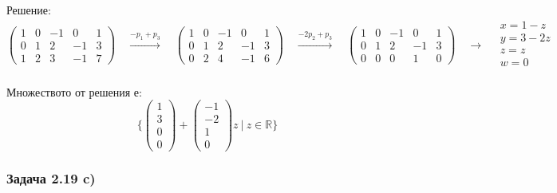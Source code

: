 \documentclass{subfiles}
\begin{document}
\noindent Решение:
\begin{equation*}
    \left(
        \begin{array}{ cccc|c }
            1 & 0 & -1 &  0 & 1 \\
            0 & 1 &  2 &  -1 & 3 \\
            1 & 2 & 3  & -1 & 7
        \end{array}
    \right)
    \quad
    \overset{-p_{1} + p_{3}}{\longrightarrow}
    \quad
    \left(
        \begin{array}{ cccc|c }
            1 & 0 & -1 &  0 & 1 \\
            0 & 1 &  2 &  -1 & 3 \\
            0 & 2 &  4 & -1 & 6
        \end{array}
    \right)
    \quad
    \overset{-2p_{2} + p_{3}}{\longrightarrow}
    \quad
    \left(
        \begin{array}{ cccc|c }
            1 & 0 & -1 &  0 & 1 \\
            0 & 1 &  2 & -1 & 3 \\
            0 & 0 &  0 &  1 & 0
        \end{array}
    \right)
    \quad
    \longrightarrow
    \quad
    \begin{array}{ c }
        x = 1 - z \\
        y = 3 - 2z \\
        z = z \\
        w = 0 \\
    \end{array}
\end{equation*}

\noindent Множеството от решения е:
\begin{equation*}
    \{
        \left(\begin{array}{ c } 1 \\ 3 \\ 0 \\ 0 \end{array}\right) +
        \left(\begin{array}{ c } -1 \\ -2 \\ 1 \\ 0 \end{array}\right) z
        \ |\ z \in \mathbb{R}
    \}
\end{equation*}

\subsubsection{Задача 2.19 c)}
\end{document}
